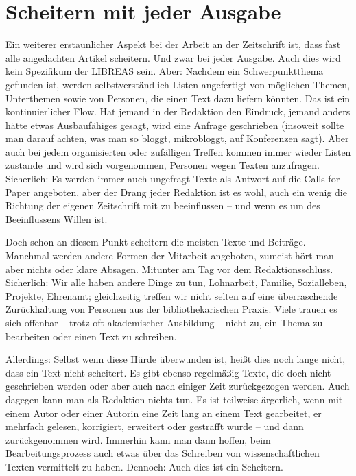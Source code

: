\documentclass[output=paper]{langscibook}
\begin{document}
\section*{Scheitern mit jeder Ausgabe}\label{Scheitern mit jeder Ausgabe} 

Ein weiterer erstaunlicher Aspekt bei der Arbeit an der Zeitschrift ist, dass fast alle angedachten Artikel scheitern. Und zwar bei jeder Ausgabe. Auch dies wird kein Spezifikum der LIBREAS sein. Aber: Nachdem ein Schwerpunktthema gefunden ist, werden selbstverständlich Listen angefertigt von möglichen Themen, Unterthemen sowie von Personen, die einen Text dazu liefern könnten. Das ist ein kontinuierlicher Flow. Hat jemand in der Redaktion den Eindruck, jemand anders hätte etwas Ausbaufähiges gesagt, wird eine Anfrage geschrieben (insoweit sollte man darauf achten, was man so bloggt, mikrobloggt, auf Konferenzen sagt). Aber auch bei jedem organisierten oder zufälligen Treffen kommen immer wieder Listen zustande und wird sich vorgenommen, Personen wegen Texten anzufragen. Sicherlich: Es werden immer auch ungefragt Texte als Antwort auf die Calls for Paper angeboten, aber der Drang jeder Redaktion ist es wohl, auch ein wenig die Richtung der eigenen Zeitschrift mit zu beeinflussen – und wenn es um des Beeinflussens Willen ist.

Doch schon an diesem Punkt scheitern die meisten Texte und Beiträge. Manchmal werden andere Formen der Mitarbeit angeboten, zumeist hört man aber nichts oder klare Absagen. Mitunter am Tag vor dem Redaktionsschluss. Sicherlich: Wir alle haben andere Dinge zu tun, Lohnarbeit, Familie, Sozialleben, Projekte, Ehrenamt; gleichzeitig treffen wir nicht selten auf eine überraschende Zurückhaltung von Personen aus der bibliothekarischen Praxis. Viele trauen es sich offenbar – trotz oft akademischer Ausbildung – nicht zu, ein Thema zu bearbeiten oder einen Text zu schreiben.

Allerdings: Selbst wenn diese Hürde überwunden ist, heißt dies noch lange nicht, dass ein Text nicht scheitert. Es gibt ebenso regelmäßig Texte, die doch nicht geschrieben werden oder aber auch nach einiger Zeit zurückgezogen werden. Auch dagegen kann man als Redaktion nichts tun. Es ist teilweise ärgerlich, wenn mit einem Autor oder einer Autorin eine Zeit lang an einem Text gearbeitet, er mehrfach gelesen, korrigiert, erweitert oder gestrafft wurde – und dann zurückgenommen wird. Immerhin kann man dann hoffen, beim Bearbeitungsprozess auch etwas über das Schreiben von wissenschaftlichen Texten vermittelt zu haben. Dennoch: Auch dies ist ein Scheitern.
\end{document}
